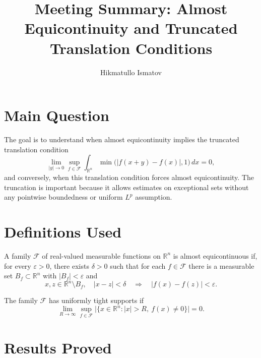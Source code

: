 \documentclass[11pt]{article}
\title{Meeting Summary: Almost Equicontinuity and Truncated Translation Conditions}
\author{Hikmatullo Ismatov}
\date{}
\newcommand{\R}{\mathbb{R}}
\newcommand{\F}{\mathcal{F}}
\newcommand{\eps}{\varepsilon}
\newcommand{\meas}[1]{\lvert #1\rvert}
\begin{document}
\maketitle

\section*{Main Question}

The goal is to understand when almost equicontinuity implies the truncated
translation condition
\[
    \lim_{|y|\to0}\sup_{f\in\F}
    \int_{\R^n}\min\bigl(|f(x+y)-f(x)|,1\bigr)\,dx=0,
\]
and conversely, when this translation condition forces almost equicontinuity.
The truncation is important because it allows estimates on exceptional sets
without any pointwise boundedness or uniform $L^p$ assumption.

\section*{Definitions Used}

A family $\F$ of real-valued measurable functions on $\R^n$ is almost
equicontinuous if, for every $\eps>0$, there exists $\delta>0$ such that for
each $f\in\F$ there is a measurable set $B_f\subset\R^n$ with
$\meas{B_f}<\eps$ and
\[
    x,z\in\R^n\setminus B_f,\quad |x-z|<\delta
    \quad\Longrightarrow\quad
    |f(x)-f(z)|<\eps .
\]

The family $\F$ has uniformly tight supports if
\[
    \lim_{R\to\infty}\sup_{f\in\F}
    \meas{\{x\in\R^n: |x|>R,\ f(x)\ne0\}}=0.
\]

\section*{Results Proved}
\end{document}
